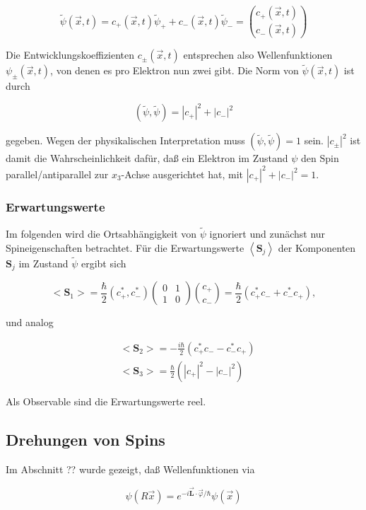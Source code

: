 \documentclass[10pt, letterpaper]{article}
\begin{document}
$$
\tilde{\psi}(\vec{x}, t)=c_{+}(\vec{x}, t) \tilde{\psi}_{+}+c_{-}(\vec{x}, t) \tilde{\psi}_{-}=\binom{c_{+}(\vec{x}, t)}{c_{-}(\vec{x}, t)}
$$

Die Entwicklungskoeffizienten $c_{ \pm}(\vec{x}, t)$ entsprechen also Wellenfunktionen $\psi_{ \pm}(\vec{x}, t)$, von denen es pro Elektron nun zwei gibt. Die Norm von $\tilde{\psi}(\vec{x}, t)$ ist durch

$$
(\tilde{\psi}, \tilde{\psi})=\left|c_{+}\right|^{2}+\left|c_{-}\right|^{2}
$$

gegeben. Wegen der physikalischen Interpretation muss $(\tilde{\psi}, \tilde{\psi})=1$ sein. $\left|c_{ \pm}\right|^{2}$ ist damit die Wahrscheinlichkeit dafür, daß ein Elektron im Zustand $\psi$ den Spin parallel/antiparallel zur $x_{3}$-Achse ausgerichtet hat, mit $\left|c_{+}\right|^{2}+\left|c_{-}\right|^{2}=1$.

\subsubsection*{Erwartungswerte}
Im folgenden wird die Ortsabhängigkeit von $\tilde{\psi}$ ignoriert und zunächst nur Spineigenschaften betrachtet. Für die Erwartungswerte $\left\langle\mathbf{S}_{j}\right\rangle$ der Komponenten $\mathbf{S}_{j}$ im Zustand $\tilde{\psi}$ ergibt sich

$$
<\mathbf{S}_{1}>=\frac{\hbar}{2}\left(c_{+}^{*}, c_{-}^{*}\right)\left(\begin{array}{ll}
0 & 1 \\
1 & 0
\end{array}\right)\binom{c_{+}}{c_{-}}=\frac{\hbar}{2}\left(c_{+}^{*} c_{-}+c_{-}^{*} c_{+}\right),
$$

und analog

$$
\begin{aligned}
& <\mathbf{S}_{2}>=-\frac{i \hbar}{2}\left(c_{+}^{*} c_{-}-c_{-}^{*} c_{+}\right) \\
& <\mathbf{S}_{3}>=\frac{\hbar}{2}\left(\left|c_{+}\right|^{2}-\left|c_{-}\right|^{2}\right)
\end{aligned}
$$

Als Observable sind die Erwartungswerte reel.

\subsection*{Drehungen von Spins}
Im Abschnitt ?? wurde gezeigt, daß Wellenfunktionen via

$$
\psi(R \vec{x})=e^{-i \overrightarrow{\mathbf{L}} \cdot \vec{\varphi} / \hbar} \psi(\vec{x})
$$
\end{document}
